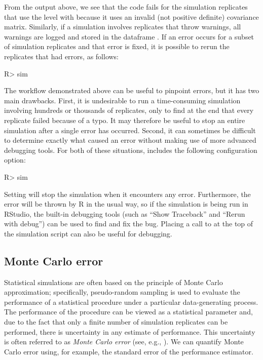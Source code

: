 From the output above, we see that the code fails for the simulation replicates that use the level with  because it uses an invalid (not positive definite) covariance matrix. Similarly, if a simulation involves replicates that throw warnings, all warnings are logged and stored in the dataframe . If an error occurs for a subset of simulation replicates and that error is fixed, it is possible to rerun the replicates that had errors, as follows:

\begin{example}
R> sim %
\end{example}

The workflow demonstrated above can be useful to pinpoint errors, but it has two main drawbacks. First, it is undesirable to run a time-consuming simulation involving hundreds or thousands of replicates, only to find at the end that every replicate failed because of a typo. It may therefore be useful to stop an entire simulation after a single error has occurred. Second, it can sometimes be difficult to determine exactly what caused an error without making use of more advanced debugging tools. For both of these situations,  includes the following configuration option:

\begin{example}
R> sim %
\end{example}

Setting  will stop the simulation when it encounters any error. Furthermore, the error will be thrown by R in the usual way, so if the simulation is being run in RStudio, the built-in debugging tools (such as ``Show Traceback'' and ``Rerun with debug'') can be used to find and fix the bug. Placing a call to  at the top of the simulation script can also be useful for debugging.

\subsection{Monte Carlo error}\label{sec:mc error}

Statistical simulations are often based on the principle of Monte Carlo approximation; specifically, pseudo-random sampling is used to evaluate the performance of a statistical procedure under a particular data-generating process. The performance of the procedure can be viewed as a statistical parameter and, due to the fact that only a finite number of simulation replicates can be performed, there is uncertainty in any estimate of performance. This uncertainty is often referred to as \textit{Monte Carlo error} (see, e.g., \citealp{lee1999effect}). We can quantify Monte Carlo error using, for example, the standard error of the performance estimator.

